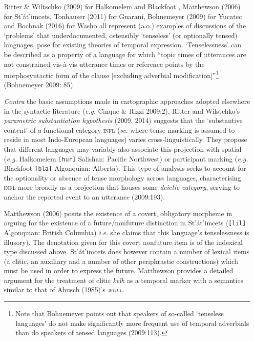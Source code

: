 \documentclass[12pt]{article}
\newcommand{\mcom}[1]
 {\marginpar{\raggedleft\raggedright\hspace{0pt}\linespread{0.9}\footnotesize{#1}}}
\renewcommand{\mcom}[1]{}
\begin{document}
Ritter \& Wiltschko (2009) for Halkomelem and Blackfoot , Matthewson (2006) for St'át'imcets, Tonhauser (2011) for Guaraní, Bohnemeyer (2009) for Yucatec and Bochnak (2016) for Washo all represent (a.o.) examples of discussions of the `problems' that underdocumented, ostensibly `tenseless' (or optionally tensed) languages, pose for existing theories of temporal expression. `Tenselessness' can be described as a property of a language for which ``topic times of utterances are not constrained vis-à-vis utterance times or reference points by the morphosyntactic form of the clause [excluding adverbial modification]''\footnote{Note that Bohnemeyer points out that speakers of so-called `tenseless languages' do not make significantly more frequent use of temporal adverbials than do speakers of tensed languages (2009:113).} (Bohnemeyer 2009: 85). 


 \textit{Contra} the basic assumptions made in cartographic approaches adopted elsewhere in the syntactic literature (\textit{e.g.} Cinque \& Rizzi 2009:2), Ritter and Wilstchko's \textit{parametric substantiation hypothesis} (2009, 2014) suggests that the `substantive content' of a functional category \textsc{infl} (\textit{sc.} where tense marking is assumed to reside in most Indo-European languages) varies cross-linguistically. They propose that different languages may variably also associate this projection with spatial (\textit{e.g.} Halkomelem \texttt{[hur]} Salishan: Pacific Northwest) or participant marking (\textit{e.g.} Blackfoot \texttt{[bla]} Algonquian: Alberta). This type of analysis seeks to account for the optionality or absence of tense morphology across languages, characterising \textsc{infl} more broadly as a projection that houses some \textit{deictic category}, serving to anchor the reported event to an utterance (2009:193).%



Matthewson (2006) posits the existence of a covert, obligatory morpheme in arguing for the existence of a future/nonfuture distinction in St'át'imcets (\texttt{[lil]} Algonquian: British Columbia) \textit{i.e.} she claims that this language's tenselessness is illusory). The denotation given for this covert nonfuture item is of the indexical type discussed above. St'át'imcets does however contain a number of lexical items (a clitic, an auxiliary and a number of other periphrastic constructions) which must be used in order to express the future. Matthewson provides a detailed argument for the treatment of clitic \textit{kelh} as a temporal marker with a semantics similar to that of Abusch (1985)'s \textsc{\textit{woll}}.
\end{document}
